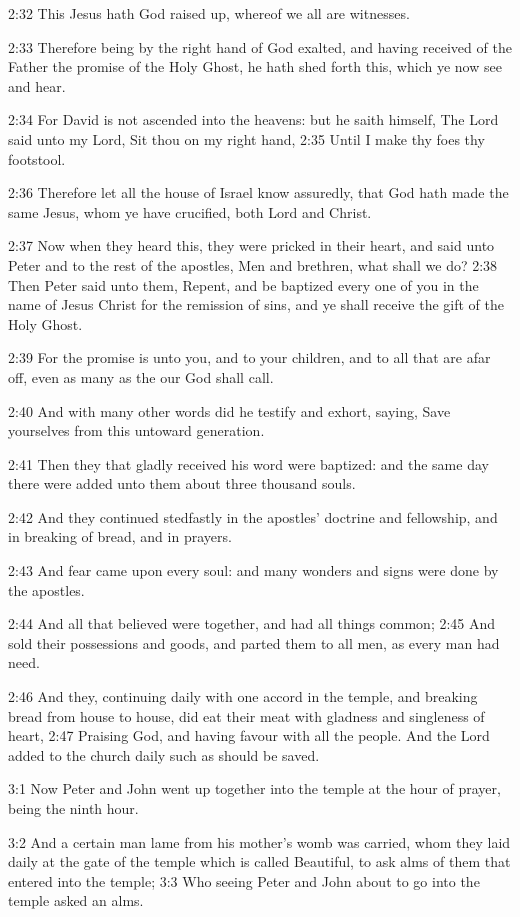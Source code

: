 2:32 This Jesus hath God raised up, whereof we all are witnesses.

2:33 Therefore being by the right hand of God exalted, and having received of the Father the promise of the Holy Ghost, he hath shed forth this, which ye now see and hear.

2:34 For David is not ascended into the heavens: but he saith himself, The Lord said unto my Lord, Sit thou on my right hand, 2:35 Until I make thy foes thy footstool.

2:36 Therefore let all the house of Israel know assuredly, that God hath made the same Jesus, whom ye have crucified, both Lord and Christ.

2:37 Now when they heard this, they were pricked in their heart, and said unto Peter and to the rest of the apostles, Men and brethren, what shall we do?  2:38 Then Peter said unto them, Repent, and be baptized every one of you in the name of Jesus Christ for the remission of sins, and ye shall receive the gift of the Holy Ghost.

2:39 For the promise is unto you, and to your children, and to all that are afar off, even as many as the \LORD our God shall call.

2:40 And with many other words did he testify and exhort, saying, Save yourselves from this untoward generation.

2:41 Then they that gladly received his word were baptized: and the same day there were added unto them about three thousand souls.

2:42 And they continued stedfastly in the apostles' doctrine and fellowship, and in breaking of bread, and in prayers.

2:43 And fear came upon every soul: and many wonders and signs were done by the apostles.

2:44 And all that believed were together, and had all things common; 2:45 And sold their possessions and goods, and parted them to all men, as every man had need.

2:46 And they, continuing daily with one accord in the temple, and breaking bread from house to house, did eat their meat with gladness and singleness of heart, 2:47 Praising God, and having favour with all the people. And the Lord added to the church daily such as should be saved.

3:1 Now Peter and John went up together into the temple at the hour of prayer, being the ninth hour.

3:2 And a certain man lame from his mother's womb was carried, whom they laid daily at the gate of the temple which is called Beautiful, to ask alms of them that entered into the temple; 3:3 Who seeing Peter and John about to go into the temple asked an alms.


